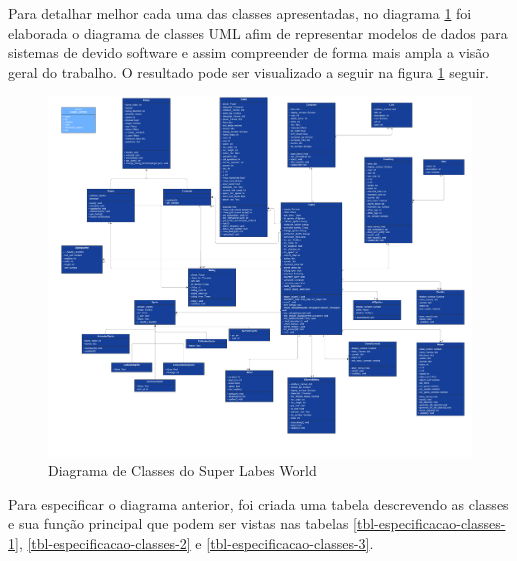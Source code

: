 Para detalhar melhor cada uma das classes apresentadas, no diagrama \ref{fig:diagrama-de-classes-uml} foi elaborada o diagrama de classes UML afim de representar modelos de dados para sistemas de devido software e assim compreender de forma mais ampla a visão geral do trabalho. O resultado pode ser visualizado a seguir na figura \ref{fig:diagrama-de-classes-uml}
seguir. 
\begin{landscape}
\begin{figure}[h!]
    \centering
    \includegraphics[width=0.8\linewidth]{figuras/diagrama-de-classes-uml.png}
    \caption{Diagrama de Classes do Super Labes World}
    \label{fig:diagrama-de-classes-uml}
\end{figure}
\end{landscape}

Para especificar o diagrama anterior, foi criada uma tabela descrevendo as classes e sua função principal que podem ser vistas nas tabelas \ref{tbl-especificacao-classes-1}, \ref{tbl-especificacao-classes-2} e \ref{tbl-especificacao-classes-3}.

